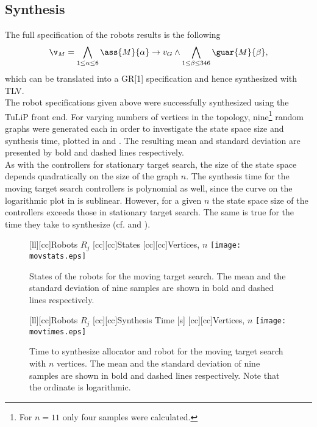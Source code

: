 \subsection{Synthesis}
	
The full specification of the robots results is the following
\begin{equation*}
	\v_M = \bigwedge_{1 \leq \alpha \leq 6} \ass{M}{\alpha} \rightarrow v_G \wedge \bigwedge_{1 \leq \beta \leq346} \guar{M}{\beta},
\end{equation*}
which can be translated into a GR[1] specification and hence synthesized with TLV.\\

The robot specifications given above were successfully synthesized using the TuLiP front end. For varying numbers of vertices in the topology, nine\footnote{For $n = 11$ only four samples were calculated.} random graphs were generated each in order to investigate the state space size and synthesis time,  plotted in  and . The resulting mean and standard deviation are presented by bold and dashed lines respectively.\\

As with the controllers for stationary target search, the size of the state space depends quadratically on the size of the graph $n$. The synthesis time for the moving target search controllers is polynomial as well, since the curve on the logarithmic plot in  is sublinear. However, for a given $n$ the state space size of the controllers exceeds those in stationary target search. The same is true for the time they take to synthesize (cf.  and ). \\

\begin{figure}
\centering
	[ll][cc]{\footnotesize{Robots $R_j$}}
	[cc][cc]{\footnotesize{States}}
	[cc][cc]{\footnotesize{Vertices, $n$}}
	\texttt{[image: movstats.eps]}
\caption{States of the robots for the moving target search. The mean and the standard deviation of nine samples are shown in bold and dashed lines respectively.}
\label{fig:movstates}
\end{figure}

\begin{figure}
\centering
	[ll][cc]{\footnotesize{Robots $R_j$}}
	[cc][cc]{\footnotesize{Synthesis Time [s]}}
	[cc][cc]{\footnotesize{Vertices, $n$}}
	\texttt{[image: movtimes.eps]}
\caption{Time to synthesize allocator and robot for the moving target search with $n$ vertices. The mean and the standard deviation of nine samples are shown in bold and dashed lines respectively. Note that the ordinate is logarithmic.}
\label{fig:movtimes}
\end{figure}


